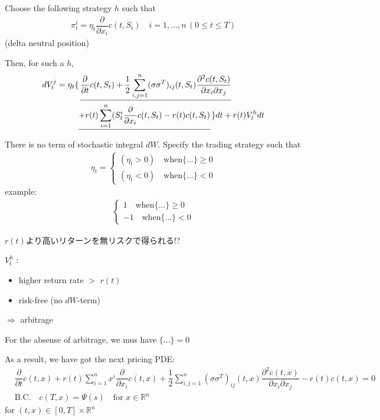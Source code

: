 \documentclass[a4paper,11pt]{jsarticle}
\theoremstyle{definition}
\newcommand{\pd}[2]{\dfrac{\partial #1}{\partial #2}}
\newcommand{\df}[2]{\dfrac{#1}{#2}}
\begin{document}
Choose the following strategy $h$ such that
\begin{align}
  \pi_t^i=\eta_t\pd{}{x_i}c(t,S_t) \quad i=1,...,n \, (0\leq t\leq T)
\end{align}
(delta neutral position)

Then, for such a $h$,
\begin{align}
  dV_t^j=\eta_t \{& \,
  \underline{\pd{}{t}c(t,S_t)+\df{1}{2}\sum_{i,j=1}^n
  (\sigma \sigma^T)_{ij}(t,S_t)
  \df{\partial^2 c(t,S_t)}{\partial x_i \partial x_j}}
  \notag\\
  &\underline{+r(t)\sum_{i=1}^n
  (S_t^i \pd{}{x_i}c(t,S_t)-r(t)c(t,S_t)}
  \,\} dt + r(t)V_t^h dt
\end{align}

There is no term of stochastic integral $dW$.
Specify the trading strategy such that
\begin{align}
  \eta_t=
  \begin{cases}
    (\eta_t>0) \quad \mbox{when} \{ ...\} \geq 0\\ 
    (\eta_t<0) \quad \mbox{when} \{ ...\} <0
  \end{cases}
\end{align}
example:
\begin{align}
  \begin{cases}
    1 \quad \mbox{when} \{ ...\} \geq 0\\ 
    -1 \quad \mbox{when} \{ ...\} <0
  \end{cases}
\end{align}

$r(t)$より高いリターンを無リスクで得られる!?

$V_t^h$ :
\begin{itemize}
  \item higher return rate $>$ $r(t)$
  \item risk-free (no $dW$-term)
\end{itemize}
$\Rightarrow$ arbitrage

For the absense of arbitrage, we mus have
$\{ ...\} =0$

As a result, we have got the next pricing PDE:
\begin{align}
  &\pd{}{t}c(t,x)
  +r(t)\sum_{i=1}^n x^i \pd{}{x_i}c(t,x)
  +\df{1}{2}\sum_{i,j=1}^n
  (\sigma \sigma^T)_{ij}(t,x)
  \df{\partial^2 c(t,x)}{\partial x_i \partial x_j} 
  -r(t)c(t,x)=0 \\
  &\mbox{B.C.} \quad c(T,x)=\Psi(s) \quad \mbox{for }
  x\in\mathbb{R}^n
\end{align}
for $(t,x)\in[0,T]\times\mathbb{R}^n$
\end{document}
